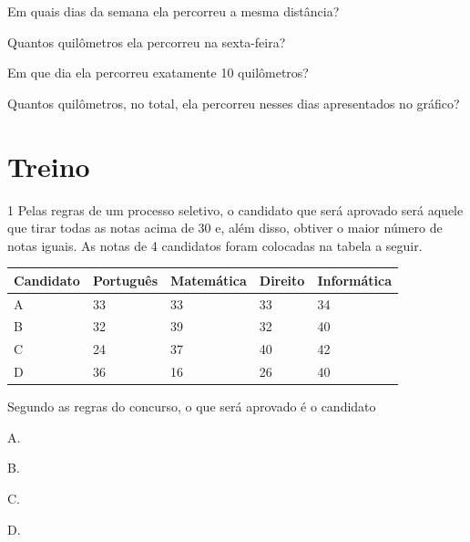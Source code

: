 \begin{escolha}
\item
  Em quais dias da semana ela percorreu a mesma distância?


\item
  Quantos quilômetros ela percorreu na sexta-feira?


\item
  Em que dia ela percorreu exatamente 10 quilômetros?


\item
  Quantos quilômetros, no total, ela percorreu nesses dias apresentados no gráfico?

\end{escolha}


\section{Treino}

\num{1} Pelas regras de um processo seletivo, o candidato que será aprovado será
aquele que tirar todas as notas acima de 30 e, além disso, obtiver o maior
número de notas iguais. As notas de 4 candidatos foram colocadas na
tabela a seguir.

\begin{longtable}[]{@{}lllll@{}}
\toprule
Candidato & Português & Matemática & Direito &
Informática\tabularnewline
\midrule
\endhead
A & 33 & 33 & 33 & 34\tabularnewline
B & 32 & 39 & 32 & 40\tabularnewline
C & 24 & 37 & 40 & 42\tabularnewline
D & 36 & 16 & 26 & 40\tabularnewline
\bottomrule
\end{longtable}

Segundo as regras do concurso, o que será aprovado é o candidato

\begin{multicols}{2}
\begin{escolha}
\item
  A.
\item
  B.
\item
  C.
\item
  D.
\end{escolha}
\end{multicols}



